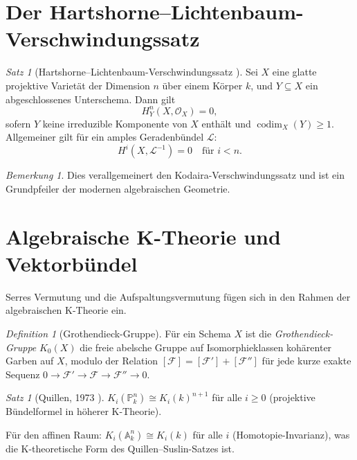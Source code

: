 \documentclass[12pt,a4paper]{amsart}
\theoremstyle{definition}
\theoremstyle{remark}
\newtheorem{satz}[theorem]{Satz}
\newtheorem{bemerkung}[theorem]{Bemerkung}
\newtheorem{definition_de}[theorem]{Definition}
\DeclareMathOperator{\codim}{codim}
\newcommand{\PP}{\mathbb{P}}
\newcommand{\OO}{\mathcal{O}}
\begin{document}
\section{Der Hartshorne--Lichtenbaum-Verschwindungssatz}

\begin{satz}[Hartshorne--Lichtenbaum-Verschwindungssatz \cite{Hartshorne1968}]
Sei $X$ eine glatte projektive Varietät der Dimension $n$ über einem Körper $k$,
und $Y \subseteq X$ ein abgeschlossenes Unterschema.  Dann gilt
\[
  H^n_Y(X, \OO_X) = 0,
\]
sofern $Y$ keine irreduzible Komponente von $X$ enthält und
$\codim_X(Y) \ge 1$.  Allgemeiner gilt für ein amples Geradenbündel $\mathcal{L}$:
\[
  H^i(X, \mathcal{L}^{-1}) = 0 \quad \text{für } i < n.
\]
\end{satz}

\begin{bemerkung}
Dies verallgemeinert den Kodaira-Verschwindungssatz und ist ein Grundpfeiler
der modernen algebraischen Geometrie.
\end{bemerkung}

\section{Algebraische K-Theorie und Vektorbündel}

Serres Vermutung und die Aufspaltungsvermutung fügen sich in den Rahmen der
algebraischen K-Theorie ein.

\begin{definition_de}[Grothendieck-Gruppe]
Für ein Schema $X$ ist die \emph{Grothendieck-Gruppe} $K_0(X)$ die freie
abelsche Gruppe auf Isomorphieklassen kohärenter Garben auf $X$, modulo der
Relation $[\mathcal{F}] = [\mathcal{F}'] + [\mathcal{F}'']$ für jede kurze
exakte Sequenz $0 \to \mathcal{F}' \to \mathcal{F} \to \mathcal{F}'' \to 0$.
\end{definition_de}

\begin{satz}[Quillen, 1973 \cite{Quillen1973}]
$K_i(\PP^n_k) \cong K_i(k)^{n+1}$ für alle $i \ge 0$
(projektive Bündelformel in höherer K-Theorie).
\end{satz}

Für den affinen Raum: $K_i(\mathbb{A}^n_k) \cong K_i(k)$ für alle $i$
(Homotopie-Invarianz), was die K-theoretische Form des Quillen--Suslin-Satzes ist.
\end{document}
